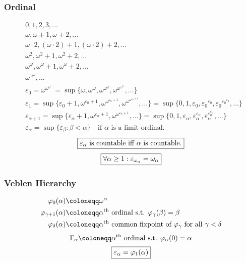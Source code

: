\documentclass[UTF8,11pt,colorlinks,compress,openany]{beamer}%
\begin{document}
\begin{frame}\frametitle{Ordinal}\vspace{-3ex}
\begin{align*}
			&0, 1, 2, 3,\dots\\
			&\omega, \omega+1, \omega+2,\dots\\
			&\omega\cdot 2, (\omega \cdot 2)+1, (\omega \cdot 2)+2,\dots\\
			&\omega^2, \omega^2+1, \omega^2+2,\dots\\
			&\omega^{\omega}, \omega^{\omega}+1, \omega^{\omega}+2,\dots\\
			&\omega^{\omega^{\omega}},\dots\\
			&\varepsilon_0=\omega^{\omega^{\omega^{\cdot^{\cdot^{\cdot}}}}}=\sup\{\omega,\omega^{\omega},\omega^{\omega^{\omega}},\omega^{\omega^{\omega^{\omega}}},\dots\}\\
			&\varepsilon_1=\sup\{\varepsilon_0+1,\omega^{\varepsilon_0+1},\omega^{\omega^{\varepsilon_0+1}},\omega^{\omega^{\omega^{\varepsilon_0+1}}},\dots\}=\sup\{0,1,\varepsilon_0,{\varepsilon_0}^{\varepsilon_0},{\varepsilon_0}^{{\varepsilon_0}^{\varepsilon_0}},\ldots\}\\
			&\varepsilon_{\alpha+1}=\sup\{\varepsilon_{\alpha }+1,\omega^{\varepsilon_{\alpha }+1},\omega ^{\omega^{\varepsilon_{\alpha }+1}},\dots \}=\sup\{0,1,\varepsilon_{\alpha },\varepsilon_{\alpha }^{\varepsilon_{\alpha }},\varepsilon_{\alpha }^{\varepsilon_{\alpha }^{\varepsilon_{\alpha }}},\dots\}\\
			&\varepsilon_\alpha=\sup\{\varepsilon _{\beta}:\beta<\alpha\}\quad\mbox{if $\alpha$ is a limit ordinal.}
			\end{align*}
			\[\fbox{$\varepsilon_\alpha$ is countable iff $\alpha$ is countable.}\]
			\[\fbox{$\forall \alpha \geq 1:\varepsilon_{\omega_\alpha}=\omega_\alpha$}\]
\end{frame}

\begin{frame}\frametitle{Veblen Hierarchy}
\begin{align*}
\varphi_0(\alpha)&\coloneqq \omega^\alpha\\
\varphi_{\gamma+1}(\alpha)&\coloneqq \alpha\textsuperscript{th} \mbox{ ordinal s.t. } \varphi_\gamma(\beta)=\beta\\
\varphi_\delta(\alpha)&\coloneqq \alpha\textsuperscript{th} \mbox{ common fixpoint of $\varphi_\gamma$ for all } \gamma<\delta
\end{align*}
\[\Gamma_\alpha\coloneqq \alpha\textsuperscript{th} \mbox{ ordinal s.t. } \varphi_\alpha(0)=\alpha\]
\[\fbox{$\varepsilon_\alpha=\varphi_1(\alpha)$}\]
\end{frame}
\end{document}

